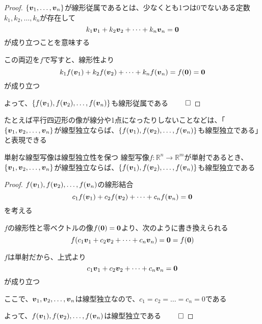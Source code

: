 \documentclass[../../../topic_linear-algebra]{subfiles}
\begin{document}
\begin{proof}
  $\{\vb*{v}_1, \dots, \vb*{v}_n\}$が線形従属であるとは、少なくとも1つは0でないある定数$k_1, k_2, \dots, k_n$が存在して
  \begin{equation*}
    k_1 \vb*{v}_1 + k_2 \vb*{v}_2 + \dots + k_n \vb*{v}_n = \vb*{0}
  \end{equation*}
  が成り立つことを意味する

  この両辺を$f$で写すと、線形性より
  \begin{equation*}
    k_1 f(\vb*{v}_1) + k_2 f(\vb*{v}_2) + \dots + k_n f(\vb*{v}_n) = f(\vb*{0}) = \vb*{0}
  \end{equation*}
  が成り立つ

  よって、$\{ f(\vb*{v}_1), f(\vb*{v}_2), \dots, f(\vb*{v}_n) \}$も線形従属である $\qed$
\end{proof}

\sectionline

たとえば平行四辺形の像が線分や1点になったりしないことなどは、「$\{ \vb*{v}_1, \vb*{v}_2, \dots, \vb*{v}_n \}$が線型独立ならば、$\{ f(\vb*{v}_1), f(\vb*{v}_2), \dots, f(\vb*{v}_n) \}$も線型独立である」と表現できる

\begin{theorem}{単射な線型写像は線型独立性を保つ}\label{thm:injective-preserves-independence}
  線型写像$f\colon \mathbb{R}^n \to \mathbb{R}^m$が単射であるとき、$\{ \vb*{v}_1, \vb*{v}_2, \dots, \vb*{v}_n \}$が線型独立ならば、$\{ f(\vb*{v}_1), f(\vb*{v}_2), \dots, f(\vb*{v}_n) \}$も線型独立である
\end{theorem}

\begin{proof}
  $f(\vb*{v}_1), f(\vb*{v}_2), \dots, f(\vb*{v}_n)$の線形結合
  \begin{equation*}
    c_1 f(\vb*{v}_1) + c_2 f(\vb*{v}_2) + \dots + c_n f(\vb*{v}_n) = \vb*{0}
  \end{equation*}
  を考える

  $f$の線形性と零ベクトルの像$f(\vb*{0}) = \vb*{0}$より、次のように書き換えられる
  \begin{equation*}
    f(c_1 \vb*{v}_1 + c_2 \vb*{v}_2 + \dots + c_n \vb*{v}_n) = \vb*{0} = f(\vb*{0})
  \end{equation*}

  $f$は単射だから、上式より
  \begin{equation*}
    c_1 \vb*{v}_1 + c_2 \vb*{v}_2 + \dots + c_n \vb*{v}_n = \vb*{0}
  \end{equation*}
  が成り立つ

  ここで、$\vb*{v}_1, \vb*{v}_2, \dots, \vb*{v}_n$は線型独立なので、$c_1 = c_2 = \dots = c_n = 0$である

  よって、$f(\vb*{v}_1), f(\vb*{v}_2), \dots, f(\vb*{v}_n)$は線型独立である $\qed$
\end{proof}
\end{document}
